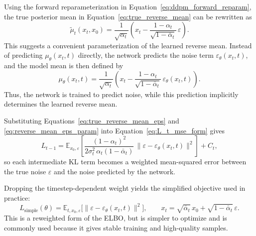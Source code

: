 Using the forward reparameterization in Equation~\ref{eq:ddpm_forward_reparam}, the true posterior mean in Equation~\ref{eq:true_reverse_mean} can be rewritten as
\begin{equation}
    \tilde{\mu}_t(x_t,x_0)
    =
    \frac{1}{\sqrt{\alpha_t}}
    \left(
        x_t
        -
        \frac{1-\alpha_t}{\sqrt{1-\bar{\alpha}_t}}\,
        \varepsilon
    \right).
    \label{eq:true_reverse_mean_eps}
\end{equation}
This suggests a convenient parameterization of the learned reverse mean. Instead of predicting \(\mu_\theta(x_t,t)\) directly, the network predicts the noise term \(\varepsilon_\theta(x_t,t)\), and the model mean is then defined by
\begin{equation}
    \mu_\theta(x_t,t)
    =
    \frac{1}{\sqrt{\alpha_t}}
    \left(
        x_t
        -
        \frac{1-\alpha_t}{\sqrt{1-\bar{\alpha}_t}}\,
        \varepsilon_\theta(x_t,t)
    \right).
    \label{eq:reverse_mean_eps_param}
\end{equation}
Thus, the network is trained to predict noise, while this prediction implicitly determines the learned reverse mean.

Substituting Equations~\ref{eq:true_reverse_mean_eps} and \ref{eq:reverse_mean_eps_param} into Equation~\ref{eq:L_t_mse_form} gives
\begin{equation}
    L_{t-1}
    =
    \mathbb{E}_{x_0,\varepsilon}
    \left[
        \frac{(1-\alpha_t)^2}{2\sigma_t^2\,\alpha_t(1-\bar{\alpha}_t)}
        \,
        \bigl\|
            \varepsilon
            -
            \varepsilon_\theta(x_t,t)
        \bigr\|^2
    \right]
    + C_t,
    \label{eq:weighted_noise_loss}
\end{equation}
so each intermediate KL term becomes a weighted mean-squared error between the true noise \(\varepsilon\) and the noise predicted by the network.

Dropping the timestep-dependent weight yields the simplified objective used in practice:
\begin{equation}
    L_{\mathrm{simple}}(\theta)
    =
    \mathbb{E}_{t,x_0,\varepsilon}
    \bigl[
        \|
            \varepsilon
            -
            \varepsilon_\theta(x_t,t)
        \|^2
    \bigr],
    \qquad
    x_t
    =
    \sqrt{\bar{\alpha}_t}\,x_0
    +
    \sqrt{1-\bar{\alpha}_t}\,\varepsilon.
    \label{eq:ddpm_simple_loss}
\end{equation}
This is a reweighted form of the ELBO, but is simpler to optimize and is commonly used because it gives stable training and high-quality samples.

